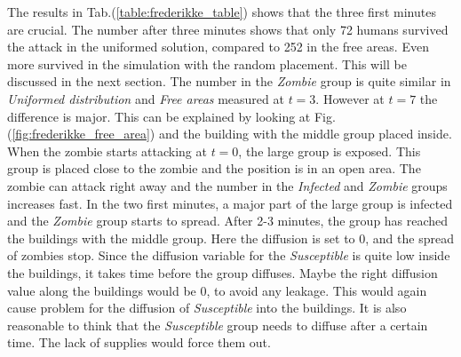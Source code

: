 \documentclass[%
twoside,                 %
final,                   %
10pt]{article}
\begin{document}
The results in Tab.(\ref{table:frederikke_table}) shows that the three first minutes are crucial. The number after three minutes shows that only 72 humans survived the attack in the uniformed solution, compared to 252 in the free areas. Even more survived in the simulation with the random placement. This will be discussed in the next section. The number in the \emph{Zombie} group is quite similar in \emph{Uniformed distribution} and \emph{Free areas} measured at $t=3$. However at $t=7$ the difference is major. This can be explained by looking at Fig.(\ref{fig:frederikke_free_area}) and the building with the middle group placed inside. When the zombie starts attacking at $t=0$, the large group is exposed. This group is placed close to the zombie and the position is in an open area. The zombie can attack right away and the number in the \emph{Infected} and \emph{Zombie} groups increases fast. In the two first minutes, a major part of the large group is infected and the \emph{Zombie} group starts to spread. After 2-3 minutes, the group has reached the buildings with the middle group. Here the diffusion is set to 0, and the spread of zombies stop. Since the diffusion variable for the \emph{Susceptible} is quite low inside the buildings, it takes time before the group diffuses. Maybe the right diffusion value along the buildings would be 0, to avoid any leakage. This would again cause problem for the diffusion of \emph{Susceptible} into the buildings. It is also reasonable to think that the \emph{Susceptible} group needs to diffuse after a certain time. The lack of supplies would force them out.




\label{table:frederikke_table}
\end{document}
